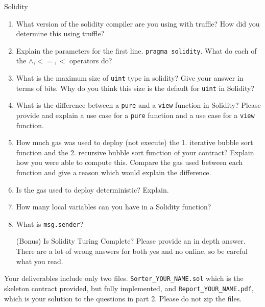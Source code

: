 \documentclass[11pt]{article}
\begin{document}
Solidity
\begin{enumerate}
	\item What version of the solidity compiler are you using with truffle? How did you determine this using truffle?
	\item Explain the parameters for the first line. \texttt{pragma solidity}. What do each of the $\wedge$,$<=,<$ operators do?
	
	
	\item What is the maximum size of \texttt{uint} type in solidity? Give your answer in terms of bits. Why do you think this size is the default for \texttt{uint} in Solidity?
	
	
	\item What is the difference between a \texttt{pure} and a \texttt{view} function in Solidity? Please provide and explain a use case for a \texttt{pure} function and a use case for a \texttt{view} function.
	
	\item How much gas was used to deploy (not execute) the 1. iterative bubble sort function and the 2. recursive bubble sort function of your contract? Explain how you were able to compute this. Compare the gas used between each function and give a reason which would explain the difference. 
	
	\item Is the gas used to deploy deterministic? Explain.
	\item How many local variables can you have in a Solidity function?


	\item What is \texttt{msg.sender}? 
	
	
	\item[(Bonus)] Is Solidity Turing Complete? Please provide an in depth answer. There are a lot of wrong answers for both yes and no online, so be careful what you read. 

\end{enumerate}


Your deliverables include only two files. \texttt{Sorter\_YOUR\_NAME.sol} which is the skeleton contract provided, but fully implemented, and \texttt{Report\_YOUR\_NAME.pdf}, which is your solution to the questions in part 2. Please do not zip the files. 
\end{document}
